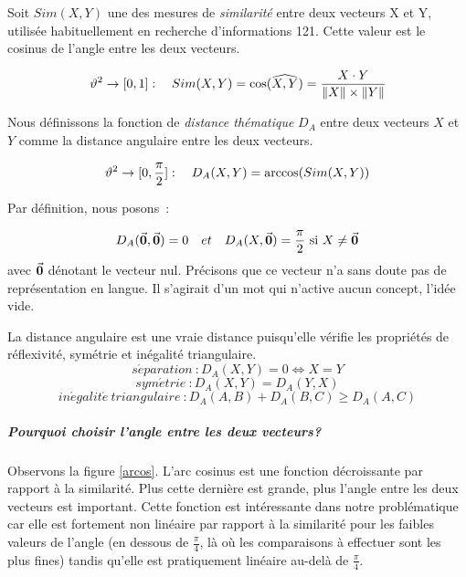 {Soit $Sim(X,Y)$ une des mesures de \emph{similarité} entre deux
vecteurs X et Y, utilisée habituellement en recherche d'informations
\citep{SalMac1983}{121}.  Cette valeur est le cosinus de l'angle entre
les deux vecteurs.

\begin{equation}\label{formSimilarite}
\vartheta^{2}\rightarrow [0,1]: \quad Sim(X,Y) = \cos(\widehat{X,Y})  =  {X \cdot Y \over\|X\|\times \|Y\|}\\
\end{equation}

Nous définissons la fonction de \emph{distance thématique} $D_{A}$
entre deux vecteurs $X$ et $Y$ comme la distance angulaire entre les
deux vecteurs.

\begin{equation}\label{formDistAng}
\vartheta^{2}\rightarrow [0,\frac{\pi}{2}]: \quad D_{A}(X,Y) = \arccos(Sim(X,Y))
\end{equation}

Par définition, nous posons~:

\begin{equation}\label{eq:5}
D_{A}(\vec{\mathbf{0}},\vec{\mathbf{0}}) = 0 \quad et \quad D_{A}(X,\vec{\mathbf{0}}) = \frac{\pi}{2}
\mbox{ si }X \neq \vec{\mathbf{0}}
\end{equation}
avec $\vec{\mathbf{0}}$ dénotant le vecteur nul. Précisons que ce vecteur n'a
sans doute pas de représentation en langue. Il s'agirait d'un mot qui
n'active aucun concept, l'idée vide.

La distance angulaire est une vraie distance puisqu'elle vérifie les
propriétés de réflexivité, symétrie et inégalité triangulaire.
%
\begin{equation}
  s\acute{e}paration~: D_A(X, Y ) = 0 \Leftrightarrow X = Y \label{eq:1}
\end{equation}
\begin{equation}
  sym\acute{e}trie~: D_A(X, Y) = D_A(Y, X)\label{eq:2}
\end{equation}
\begin{equation}
  in\acute{e}galit\acute{e} \ triangulaire~: D_A(A,B)+D_A(B,C)\geq D_A(A,C)\label{eq:3}
\end{equation}
%

\subparagraph{Pourquoi choisir l'angle entre les deux vecteurs?}\label{sec:pourq-chois-langle}

Observons la figure \ref{arcos}. L'arc cosinus est une fonction
décroissante par rapport à la similarité. Plus cette dernière est
grande, plus l'angle entre les deux vecteurs est important. Cette
fonction est intéressante dans notre problématique car elle est
fortement non linéaire par rapport à la similarité pour les faibles
valeurs de l'angle (en dessous de $\frac{\pi}{4}$, là où les
comparaisons à effectuer sont les plus fines) tandis qu'elle est
pratiquement linéaire au-delà de $\frac{\pi}{4}$.

}
